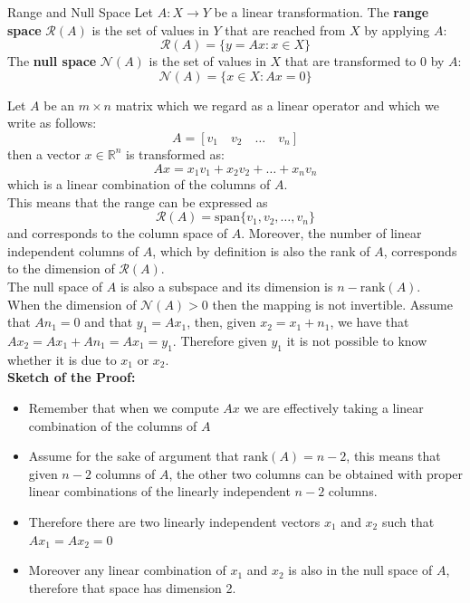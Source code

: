 \begin{definitionbox}{Range and Null Space}
Let \( A: X \rightarrow Y \) be a linear transformation. The \textbf{range space} \( \mathcal{R}(A) \) is the set of values in \( Y \) that are reached from \( X \) by applying \( A \):
\[ \mathcal{R}(A) = \{y = Ax : x \in X\} \]
The \textbf{null space} \( \mathcal{N}(A) \) is the set of values in \( X \) that are transformed to \( 0 \) by \( A \):
\[ \mathcal{N}(A) = \{x \in X : Ax = 0\} \]

Let \( A \) be an \( m \times n \) matrix which we regard as a linear operator and which we write as follows:
\[ A = [v_1 \quad v_2 \quad \ldots \quad v_n] \]
then a vector \( x \in \mathbb{R}^n \) is transformed as:
\[ Ax = x_1v_1 + x_2v_2 + \ldots + x_nv_n \]
which is a linear combination of the columns of \( A \).\\

This means that the range can be expressed as
\[ \mathcal{R}(A) = \text{span}\{v_1, v_2, \ldots, v_n\} \]
and corresponds to the column space of \( A \). Moreover, the number of linear independent columns of \( A \), which by definition is also the rank of \( A \), corresponds to the dimension of \( \mathcal{R}(A) \).\\

The null space of \( A \) is also a subspace and its dimension is \( n - \text{rank}(A) \).\\

When the dimension of \( \mathcal{N}(A) > 0 \) then the mapping is not invertible. Assume that \( An_1 = 0 \) and that \( y_1 = Ax_1 \), then, given \( x_2 = x_1 + n_1 \), we have that \( Ax_2 = Ax_1 + An_1 = Ax_1 = y_1 \). Therefore given \( y_1 \) it is not possible to know whether it is due to \( x_1 \) or \( x_2 \).\\

\textbf{Sketch of the Proof:}
\begin{itemize}
  \item Remember that when we compute \( Ax \) we are effectively taking a linear combination of the columns of \( A \)
  \item Assume for the sake of argument that \( \text{rank}(A) = n - 2 \), this means that given \( n - 2 \) columns of \( A \), the other two columns can be obtained with proper linear combinations of the linearly independent \( n - 2 \) columns.
  \item Therefore there are two linearly independent vectors \( x_1 \) and \( x_2 \) such that \( Ax_1 = Ax_2 = 0 \)
  \item Moreover any linear combination of \( x_1 \) and \( x_2 \) is also in the null space of \( A \), therefore that space has dimension 2.
\end{itemize}


\end{definitionbox}
